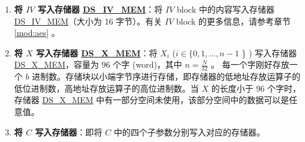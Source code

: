 \documentclass[main\_\_CN.tex]{subfiles}
\begin{document}
\begin{enumerate}
\begin{itemize}
\begin{itemize}
            \item 如果读到非零值 (1 \verb+~+ 15)，则说明 HMAC 被调用过，但是 RSA\_DS 外设没有成功从 HMAC 模块获取到 \begin{math}RSA\_DS\_KEY\end{math}。此种情况可能是因为受到了其他程序的干扰。

        \end{itemize}


    \end{itemize}

    \item {\bfseries 将 \begin{math}IV\end{math} 写入存储器 \hyperref[DSIVMEM]{DS\_IV\_MEM}}：将 \begin{math}IV\end{math} block 中的内容写入存储器 \hyperref[DSIVMEM]{DS\_IV\_MEM}（大小为 16 字节）。有关 \begin{math}IV\end{math} block 的更多信息，请参考章节 \ref{mod:aes} \textit{}。

    \item {\bfseries 将 \begin{math}X\end{math} 写入存储器 \hyperref[DSXMEM]{DS\_X\_MEM}}：将 \begin{math}X_{i}\end{math}
        (\begin{math}i \in \{ 0, 1, \dots, n-1 \end{math} \} )
        写入存储器 \hyperref[DSXMEM]{DS\_X\_MEM}，容量为 96 个字 (word)，其中 \begin{math} n = \frac{N}{32} \end{math} 。
        每一个字刚好存放一个 \begin{math}b\end{math} 进制数。存储块以小端字节序进行存储，即存储器的低地址存放运算子的低位进制数，高地址存放运算子的高位进制数。当 \begin{math}X\end{math} 的长度小于 96 个字时，存储器 \hyperref[DSXMEM]{DS\_X\_MEM} 中有一部分空间未使用，该部分空间中的数据可以是任意值。

    \item {\bfseries 将 \begin{math}C\end{math} 写入存储器}：即将 \begin{math}C\end{math} 中的四个子参数分别写入对应的存储器。
    \begin{itemize}


\end{itemize}
\end{enumerate}
\end{document}
